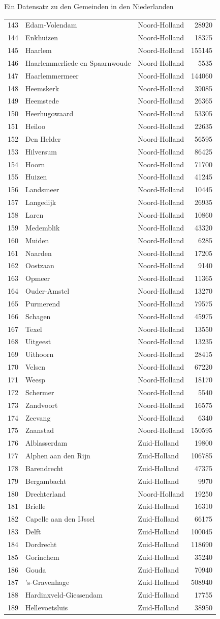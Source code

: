 \documentclass[ignorenonframetext,]{beamer}
\begin{document}
\begin{frame}[fragile]{Ein Datensatz zu den Gemeinden in den
Niederlanden}
\begin{longtable}[]{@{}lllr@{}}
143 & Edam-Volendam & Noord-Holland & 28920\tabularnewline
144 & Enkhuizen & Noord-Holland & 18375\tabularnewline
145 & Haarlem & Noord-Holland & 155145\tabularnewline
146 & Haarlemmerliede en Spaarnwoude & Noord-Holland &
5535\tabularnewline
147 & Haarlemmermeer & Noord-Holland & 144060\tabularnewline
148 & Heemskerk & Noord-Holland & 39085\tabularnewline
149 & Heemstede & Noord-Holland & 26365\tabularnewline
150 & Heerhugowaard & Noord-Holland & 53305\tabularnewline
151 & Heiloo & Noord-Holland & 22635\tabularnewline
152 & Den Helder & Noord-Holland & 56595\tabularnewline
153 & Hilversum & Noord-Holland & 86425\tabularnewline
154 & Hoorn & Noord-Holland & 71700\tabularnewline
155 & Huizen & Noord-Holland & 41245\tabularnewline
156 & Landsmeer & Noord-Holland & 10445\tabularnewline
157 & Langedijk & Noord-Holland & 26935\tabularnewline
158 & Laren & Noord-Holland & 10860\tabularnewline
159 & Medemblik & Noord-Holland & 43320\tabularnewline
160 & Muiden & Noord-Holland & 6285\tabularnewline
161 & Naarden & Noord-Holland & 17205\tabularnewline
162 & Oostzaan & Noord-Holland & 9140\tabularnewline
163 & Opmeer & Noord-Holland & 11365\tabularnewline
164 & Ouder-Amstel & Noord-Holland & 13270\tabularnewline
165 & Purmerend & Noord-Holland & 79575\tabularnewline
166 & Schagen & Noord-Holland & 45975\tabularnewline
167 & Texel & Noord-Holland & 13550\tabularnewline
168 & Uitgeest & Noord-Holland & 13235\tabularnewline
169 & Uithoorn & Noord-Holland & 28415\tabularnewline
170 & Velsen & Noord-Holland & 67220\tabularnewline
171 & Weesp & Noord-Holland & 18170\tabularnewline
172 & Schermer & Noord-Holland & 5540\tabularnewline
173 & Zandvoort & Noord-Holland & 16575\tabularnewline
174 & Zeevang & Noord-Holland & 6340\tabularnewline
175 & Zaanstad & Noord-Holland & 150595\tabularnewline
176 & Alblasserdam & Zuid-Holland & 19800\tabularnewline
177 & Alphen aan den Rijn & Zuid-Holland & 106785\tabularnewline
178 & Barendrecht & Zuid-Holland & 47375\tabularnewline
179 & Bergambacht & Zuid-Holland & 9970\tabularnewline
180 & Drechterland & Noord-Holland & 19250\tabularnewline
181 & Brielle & Zuid-Holland & 16310\tabularnewline
182 & Capelle aan den IJssel & Zuid-Holland & 66175\tabularnewline
183 & Delft & Zuid-Holland & 100045\tabularnewline
184 & Dordrecht & Zuid-Holland & 118690\tabularnewline
185 & Gorinchem & Zuid-Holland & 35240\tabularnewline
186 & Gouda & Zuid-Holland & 70940\tabularnewline
187 & 's-Gravenhage & Zuid-Holland & 508940\tabularnewline
188 & Hardinxveld-Giessendam & Zuid-Holland & 17755\tabularnewline
189 & Hellevoetsluis & Zuid-Holland & 38950\tabularnewline

\end{longtable}
\end{frame}
\end{document}

